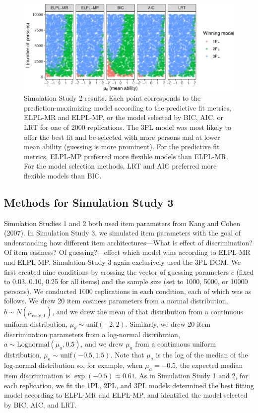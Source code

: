 \documentclass[
  english,
  man,floatsintext]{apa7}
\begin{document}
\begin{figure}

{\centering \includegraphics[width=2100px]{irt-predictive-fit-apa_files/figure-latex/results4b-1} 

}

\caption{Simulation Study 2 results. Each point corresponds to the prediction-maximizing model according to the predictive fit metrics, ELPL-MR and ELPL-MP, or the model selected by BIC, AIC, or LRT for one of 2000 replications. The 3PL model was most likely to offer the best fit and be selected with more persons and at lower mean ability (guessing is more prominent). For the predictive fit metrics, ELPL-MP preferred more flexible models than ELPL-MR. For the model selection methods, LRT and AIC preferred more flexible models than BIC.}\label{fig:results4b}
\end{figure}

\hypertarget{methods-for-simulation-study-3}{%
\subsection{Methods for Simulation Study 3}\label{methods-for-simulation-study-3}}

Simulation Studies 1 and 2 both used item parameters from Kang and Cohen (2007). In Simulation Study 3, we simulated item parameters with the goal of understanding how different item architectures---What is effect of discrimination? Of item easiness? Of guessing?---effect which model wins according to ELPL-MR and ELPL-MP. Simulation Study 3 again exclusively used the 3PL DGM. We first created nine conditions by crossing the vector of guessing parameters \(c\) (fixed to 0.03, 0.10, 0.25 for all items) and the sample size (set to 1000, 5000, or 10000 persons). We conducted 1000 replications in each condition, each of which was as follows. We drew 20 item easiness parameters from a normal distribution, \(b \sim N(\mu_{\text{easy}, 1})\), and we drew the mean of that distribution from a continuous uniform distribution, \(\mu_{\theta} \sim \text{unif}(-2, 2)\). Similarly, we drew 20 item discrimination parameters from a log-normal distribution, \(a \sim \text{Lognormal}(\mu_{a}, 0.5)\), and we drew \(\mu_{a}\) from a continuous uniform distribution, \(\mu_{a} \sim \text{unif}(-0.5, 1.5)\). Note that \(\mu_{a}\) is the log of the median of the log-normal distribution so, for example, when \(\mu_{a} = -0.5\), the expected median item discrimination is \(\exp(-0.5) \approx 0.61\). As in Simulation Study 1 and 2, for each replication, we fit the 1PL, 2PL, and 3PL models determined the best fitting model according to ELPL-MR and ELPL-MP, and identified the model selected by BIC, AIC, and LRT.
\end{document}
